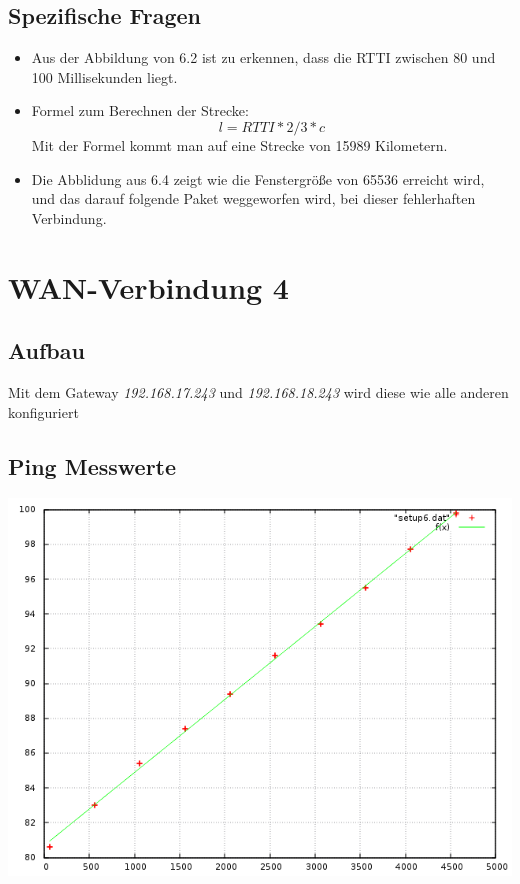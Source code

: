 \documentclass[a4paper,10pt]{article}
\begin{document}
\subsection{Spezifische Fragen}
\begin{itemize}
 \item Aus der Abbildung von 6.2 ist zu erkennen, dass die RTTI zwischen 80 und 100 Millisekunden liegt.
 \item Formel zum Berechnen der Strecke: 
 \begin{equation}
  l=RTTI*2/3*c
 \end{equation}
 Mit der Formel kommt man auf eine Strecke von 15989 Kilometern.
 \item Die Abblidung aus  6.4 zeigt wie die Fenstergröße von 65536 erreicht wird, und das darauf folgende Paket
 weggeworfen wird, bei dieser fehlerhaften Verbindung.
\end{itemize}


\section{WAN-Verbindung 4}

\subsection{Aufbau}
Mit dem Gateway \textit{192.168.17.243} und \textit{192.168.18.243} wird diese wie alle anderen konfiguriert

\subsection{Ping Messwerte}
\includegraphics[scale=0.75]{ping_setup_wan4.png}
\end{document}
